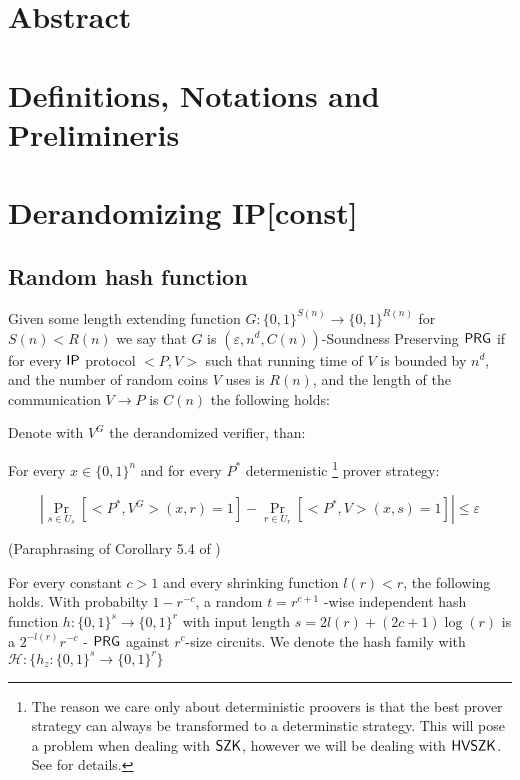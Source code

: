 \documentclass[11]{article}
\begin{document}

\section{Abstract}

\section{Definitions, Notations and Prelimineris}

\section{Derandomizing IP[const]}

\subsection{Random hash function}


Given some length extending function $G:\{0,1\}^{S(n)} \to \{0,1\}^{R(n)}$ for $S(n) < R(n)$ we say that $G$ is $(\varepsilon, n^d, C(n))$-Soundness Preserving $\mathsf{PRG}$ if for every $\mathsf{IP}$ protocol $<P,V>$ such that running time of $V$ is bounded by $n^d$, and the number of random coins $V$ uses is $R(n)$, and the length of the communication $V \to P$ is $C(n)$ the following holds:

Denote with $V^G$ the derandomized verifier, than:

For every $x \in \{0,1\}^n$ and for every $P^*$ determenistic \footnote{The reason we care only about deterministic proovers is that the best prover strategy can always be transformed to a determinstic strategy. This will pose a problem when dealing with $\mathsf{SZK}$, however we will be dealing with $\mathsf{HVSZK}$. See \cite{DL20} for details.} prover strategy:
	
$$ |\Pr_{s \in U_s}[<P^*,V^G>(x, r) = 1] - \Pr_{r \in U_r}[<P^*, V>(x, s) = 1]| \leq \varepsilon$$
	

 (Paraphrasing of Corollary 5.4 of \cite{AASY16})

For every constant $c > 1$ and every shrinking function $l(r) < r$, the following holds. With probabilty $1-r^{-c}$, a random $t=r^{c+1}$ -wise independent hash function $h: \{0,1\}^s \to \{0,1\}^r$ with input length $s = 2l(r) + (2c + 1)\log(r)$ is a $2^{-l(r)}r^{-c}$ - $\mathsf{PRG}$ against $r^c$-size circuits. We denote the hash family with $\mathcal{H}: \{h_z: \{0,1\}^s \to \{0,1\}^r\}$
\end{document}
